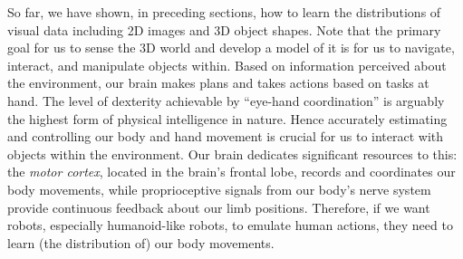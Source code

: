 %


So far, we have shown, in preceding sections, how to learn the
distributions of visual data including 2D images and 3D object
shapes. Note that the primary goal for us to sense the 3D world and
develop a model of it is for us to navigate, interact, and manipulate
objects within. Based on information perceived about the environment,
our brain makes plans and takes actions based on tasks at hand. The
level of dexterity achievable by ``eye-hand coordination'' is
arguably the highest form of physical intelligence in nature. Hence
accurately estimating and controlling our body and hand movement is
crucial for us to interact with objects within the environment. Our
brain dedicates significant resources to this: the {\em motor
cortex}, located in the brain's frontal lobe, records and coordinates
our body movements, while proprioceptive signals from our body's
nerve system provide continuous feedback about our limb positions.
Therefore, if we want robots, especially humanoid-like robots, to
emulate human actions, they need to learn (the distribution of) our
body movements.

